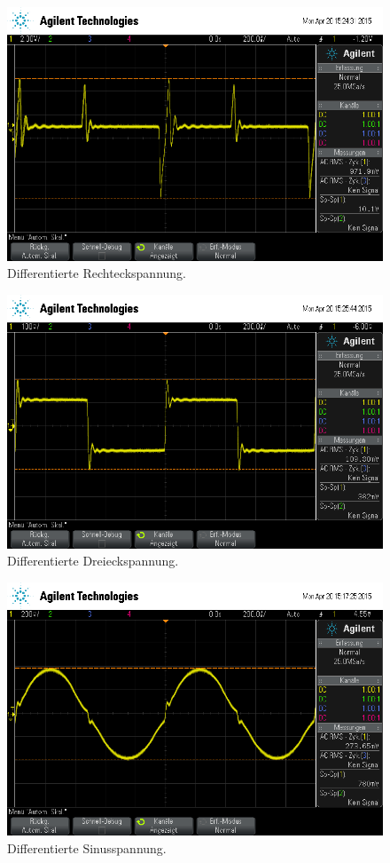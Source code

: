\begin{figure}[!h]
    \centering
    \includegraphics[width=0.8\linewidth]{data/scope_8.png}
    \caption{Differentierte Rechteckspannung.}
    \label{fig:dif_rechteck}
\end{figure}

\begin{figure}[!h]
    \centering
    \includegraphics[width=0.8\linewidth]{data/scope_9.png}
    \caption{Differentierte Dreieckspannung.}
    \label{fig:dif_dreieck}
\end{figure}

\begin{figure}[!h]
    \centering
    \includegraphics[width=0.8\linewidth]{data/scope_7.png}
    \caption{Differentierte Sinusspannung.}
    \label{fig:dif_sinus}
\end{figure}

